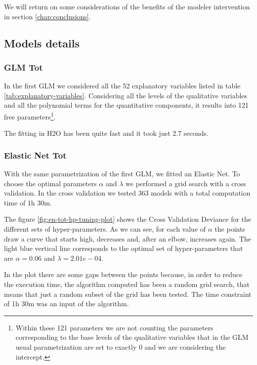 \documentclass[a4paper, twoside, openright, 12pt]{report}
\theoremstyle{definition}
\theoremstyle{definition}
\theoremstyle{definition}
\theoremstyle{remark}
\begin{document}
We will return on some considerations of the benefits of the modeler intervention in section \ref{chap:conclusions}.

\hypertarget{chap:models-details}{%
\subsection{Models details}\label{chap:models-details}}

\hypertarget{glm-tot}{%
\subsubsection{GLM Tot}\label{glm-tot}}

In the first GLM we considered all the 52 explanatory variables listed in table \ref{tab:explanatory-variables}. Considering all the levels of the qualitative variables and all the polynomial terms for the quantitative components, it results into 121 free parameters\footnote{Within these 121 parameters we are not counting the parameters corresponding to the base levels of the qualitative variables that in the GLM usual parametrization are set to exactly 0 and we are considering the intercept.}.

The fitting in H2O has been quite fast and it took just 2.7 seconds.

\hypertarget{elastic-net-tot}{%
\subsubsection{Elastic Net Tot}\label{elastic-net-tot}}

With the same parametrization of the first GLM, we fitted an Elastic Net. To choose the optimal parameters \(\alpha\) and \(\lambda\) we performed a grid search with a cross validation. In the cross validation we tested 363 models with a total computation time of 1h 30m.

The figure \ref{fig:en-tot-hp-tuning-plot} shows the Cross Validation Deviance for the different sets of hyper-parameters. As we can see, for each value of \(\alpha\) the points draw a curve that starts high, decreases and, after an elbow, increases again. The light blue vertical line corresponds to the optimal set of hyper-parameters that are \(\alpha = 0.06\) and \(\lambda = 2.01e-04\).

In the plot there are some gaps between the points because, in order to reduce the execution time, the algorithm computed has been a random grid search, that means that just a random subset of the grid has been tested. The time constraint of 1h 30m was an input of the algorithm.
\end{document}
